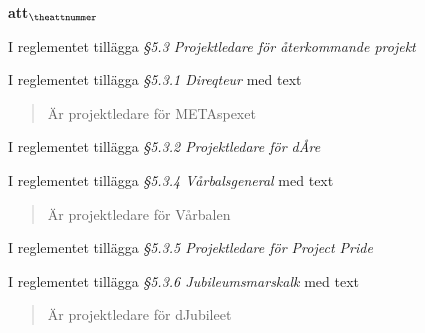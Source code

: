 \documentclass[a4paper]{article}
\begin{document}
\begin{list}{\bf att$_{\theattnummer}$}{}
%


\item I reglementet tillägga \textit{\S5.3 Projektledare för återkommande projekt}
\item I reglementet tillägga \textit{\S5.3.1 Direqteur} med text \begin{quote} Är projektledare för METAspexet \end{quote}
\item I reglementet tillägga \textit{\S5.3.2 Projektledare för dÅre}
\item I reglementet tillägga \textit{\S5.3.4 Vårbalsgeneral} med text \begin{quote} Är projektledare för Vårbalen \end{quote}
\item I reglementet tillägga \textit{\S5.3.5 Projektledare för Project Pride}
\item I reglementet tillägga \textit{\S5.3.6 Jubileumsmarskalk} med text \begin{quote} Är projektledare för dJubileet \end{quote}


\end{list}
\end{document}
